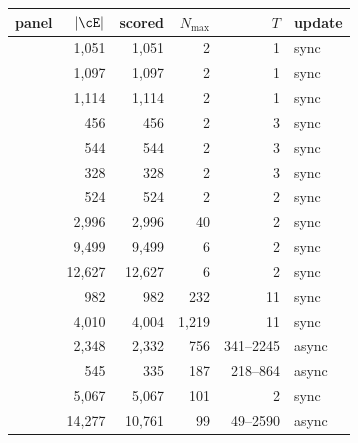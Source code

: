 \begin{tabular}{lrrrrl}
\toprule
panel & $|\cE|$ & scored & $N_{\max}$ & $T$ & update \\
\midrule
\adamsLo{} & 1,051 & 1,051 & 2 & 1 & sync \\
\adamsMid{} & 1,097 & 1,097 & 2 & 1 & sync \\
\adamsHi{} & 1,114 & 1,114 & 2 & 1 & sync \\
\takacsCtl{} & 456 & 456 & 2 & 3 & sync \\
\takacsDis{} & 544 & 544 & 2 & 3 & sync \\
\takacsInt{} & 328 & 328 & 2 & 3 & sync \\
\takacsOne{} & 524 & 524 & 2 & 2 & sync \\
\becker{} & 2,996 & 2,996 & 40 & 2 & sync \\
\vkg{} & 9,499 & 9,499 & 6 & 2 & sync \\
\vkc{} & 12,627 & 12,627 & 6 & 2 & sync \\
\senate{} & 982 & 982 & 232 & 11 & sync \\
\house{} & 4,010 & 4,004 & 1,219 & 11 & sync \\
\cmv{} & 2,348 & 2,332 & 756 & 341--2245 & async \\
\spinos{} & 545 & 335 & 187 & 218--864 & async \\
\kozitsin{} & 5,067 & 5,067 & 101 & 2 & sync \\
\markets{} & 14,277 & 10,761 & 99 & 49--2590 & async \\
\bottomrule
\end{tabular}
